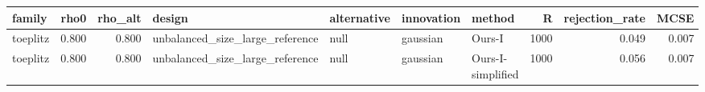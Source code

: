 \begin{tabular}{lrrllllrrr}
\toprule
family & rho0 & rho\_alt & design & alternative & innovation & method & R & rejection\_rate & MCSE \\
\midrule
toeplitz & 0.800 & 0.800 & unbalanced\_size\_large\_reference & null & gaussian & Ours-I & 1000 & 0.049 & 0.007 \\
toeplitz & 0.800 & 0.800 & unbalanced\_size\_large\_reference & null & gaussian & Ours-I-simplified & 1000 & 0.056 & 0.007 \\
\bottomrule
\end{tabular}
